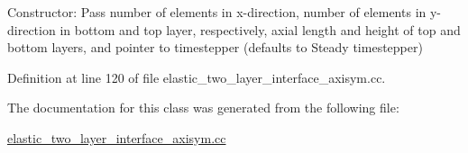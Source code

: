 Constructor\+: Pass number of elements in x-\/direction, number of elements in y-\/direction in bottom and top layer, respectively, axial length and height of top and bottom layers, and pointer to timestepper (defaults to Steady timestepper) 



Definition at line 120 of file elastic\+\_\+two\+\_\+layer\+\_\+interface\+\_\+axisym.\+cc.



The documentation for this class was generated from the following file\+:\begin{DoxyCompactItemize}
\item 
\hyperlink{elastic__two__layer__interface__axisym_8cc}{elastic\+\_\+two\+\_\+layer\+\_\+interface\+\_\+axisym.\+cc}\end{DoxyCompactItemize}
